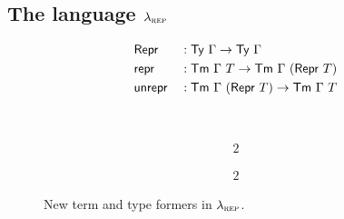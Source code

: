 \subsection{The language $\lambda_{\textsc{rep}}$}

\begin{figure}[H]
  \begin{minipage}[t]{\textwidth}%
  \begin{alignat*}{2}
  & \textsf{Repr} &&: \textsf{Ty}\ \Gamma \to \textsf{Ty}\ \Gamma \\
  & \textsf{repr} &&: \textsf{Tm}\ \Gamma\ T \to \textsf{Tm}\ \Gamma\ (\textsf{Repr}\ T) \\
  & \textsf{unrepr} &&: \textsf{Tm}\ \Gamma\ (\textsf{Repr}\ T) \to \textsf{Tm}\ \Gamma\ T
  \end{alignat*}
  \end{minipage}\\
  \begin{minipage}[t]{0.5\textwidth}%
  \begin{alignat*}{2}
  \end{alignat*}
  \end{minipage}%
  \begin{minipage}[t]{0.5\textwidth}%
  \begin{alignat*}{2}
  \end{alignat*}
  \end{minipage}%
  \caption{New term and type formers in $\lambda_{\textsc{rep}}$.}
  \label{fig:lambdarep-new-formers}
\end{figure}

